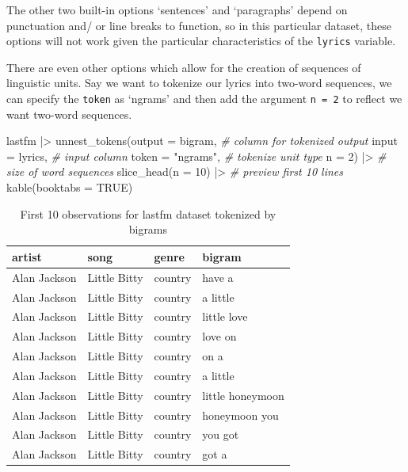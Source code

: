 \documentclass[
  letterpaper,
]{latex/krantz}
\newenvironment{Shaded}{\begin{snugshade}}{\end{snugshade}}
\newcommand{\AttributeTok}[1]{\textcolor[rgb]{0.00,0.00,0.00}{#1}}
\newcommand{\CommentTok}[1]{\textcolor[rgb]{0.00,0.00,0.00}{\textit{#1}}}
\newcommand{\ConstantTok}[1]{\textcolor[rgb]{0.00,0.00,0.00}{#1}}
\newcommand{\DecValTok}[1]{\textcolor[rgb]{0.00,0.00,0.00}{#1}}
\newcommand{\FunctionTok}[1]{\textcolor[rgb]{0.00,0.00,0.00}{#1}}
\newcommand{\NormalTok}[1]{\textcolor[rgb]{0.00,0.00,0.00}{#1}}
\newcommand{\SpecialCharTok}[1]{\textcolor[rgb]{0.00,0.00,0.00}{#1}}
\newcommand{\StringTok}[1]{\textcolor[rgb]{0.00,0.00,0.00}{#1}}
\begin{document}
The other two built-in options `sentences' and `paragraphs' depend on
punctuation and/ or line breaks to function, so in this particular
dataset, these options will not work given the particular
characteristics of the \texttt{lyrics} variable.

There are even other options which allow for the creation of sequences
of linguistic units. Say we want to tokenize our lyrics into two-word
sequences, we can specify the \texttt{token} as `ngrams' and then add
the argument \texttt{n\ =\ 2} to reflect we want two-word sequences.

\begin{Shaded}
\begin{Highlighting}[]
\NormalTok{lastfm }\SpecialCharTok{|\textgreater{}} 
  \FunctionTok{unnest\_tokens}\NormalTok{(}\AttributeTok{output =}\NormalTok{ bigram, }\CommentTok{\# column for tokenized output}
                \AttributeTok{input =}\NormalTok{ lyrics, }\CommentTok{\# input column}
                \AttributeTok{token =} \StringTok{"ngrams"}\NormalTok{, }\CommentTok{\# tokenize unit type}
                \AttributeTok{n =} \DecValTok{2}\NormalTok{) }\SpecialCharTok{|\textgreater{}}  \CommentTok{\# size of word sequences }
  \FunctionTok{slice\_head}\NormalTok{(}\AttributeTok{n =} \DecValTok{10}\NormalTok{) }\SpecialCharTok{|\textgreater{}}  \CommentTok{\# preview first 10 lines}
  \FunctionTok{kable}\NormalTok{(}\AttributeTok{booktabs =} \ConstantTok{TRUE}\NormalTok{)}
\end{Highlighting}
\end{Shaded}

\hypertarget{tbl-td-lastfm-tokenize-bigrams}{}
\begin{table}
\caption{\label{tbl-td-lastfm-tokenize-bigrams}First 10 observations for lastfm dataset tokenized by bigrams }\tabularnewline

\centering
\begin{tabular}{llll}
\toprule
artist & song & genre & bigram\\
\midrule
Alan Jackson & Little Bitty & country & have a\\
Alan Jackson & Little Bitty & country & a little\\
Alan Jackson & Little Bitty & country & little love\\
Alan Jackson & Little Bitty & country & love on\\
Alan Jackson & Little Bitty & country & on a\\
\addlinespace
Alan Jackson & Little Bitty & country & a little\\
Alan Jackson & Little Bitty & country & little honeymoon\\
Alan Jackson & Little Bitty & country & honeymoon you\\
Alan Jackson & Little Bitty & country & you got\\
Alan Jackson & Little Bitty & country & got a\\
\bottomrule
\end{tabular}
\end{table}
\end{document}
